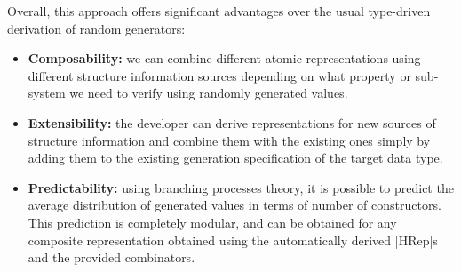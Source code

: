 Overall, this approach offers significant advantages over the usual type-driven
derivation of random generators:
%
\begin{itemize}
\item \textbf{Composability:} we can combine different atomic representations
  using different structure information sources depending on what property or
  sub-system we need to verify using randomly generated values.
\item \textbf{Extensibility:} the developer can derive representations for new
  sources of structure information and combine them with the existing ones
  simply by adding them to the existing generation specification of the target
  data type.
\item \textbf{Predictability:} using branching processes theory, it is possible
  to predict the average distribution of generated values in terms of number of
  constructors.
  This prediction is completely modular, and can be obtained for any composite
  representation obtained using the automatically derived |HRep|s and the
  provided combinators.
\end{itemize}




%
%







